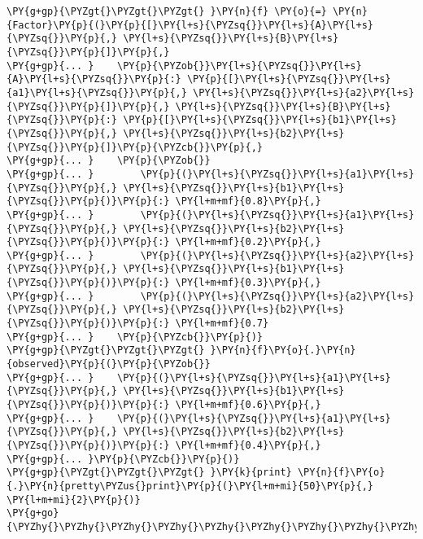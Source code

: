 \begin{fulllineitems}
\begin{fulllineitems}
\begin{Verbatim}[commandchars=\\\{\}]
\PY{g+gp}{\PYZgt{}\PYZgt{}\PYZgt{} }\PY{n}{f} \PY{o}{=} \PY{n}{Factor}\PY{p}{(}\PY{p}{[}\PY{l+s}{\PYZsq{}}\PY{l+s}{A}\PY{l+s}{\PYZsq{}}\PY{p}{,} \PY{l+s}{\PYZsq{}}\PY{l+s}{B}\PY{l+s}{\PYZsq{}}\PY{p}{]}\PY{p}{,}
\PY{g+gp}{... }    \PY{p}{\PYZob{}}\PY{l+s}{\PYZsq{}}\PY{l+s}{A}\PY{l+s}{\PYZsq{}}\PY{p}{:} \PY{p}{[}\PY{l+s}{\PYZsq{}}\PY{l+s}{a1}\PY{l+s}{\PYZsq{}}\PY{p}{,} \PY{l+s}{\PYZsq{}}\PY{l+s}{a2}\PY{l+s}{\PYZsq{}}\PY{p}{]}\PY{p}{,} \PY{l+s}{\PYZsq{}}\PY{l+s}{B}\PY{l+s}{\PYZsq{}}\PY{p}{:} \PY{p}{[}\PY{l+s}{\PYZsq{}}\PY{l+s}{b1}\PY{l+s}{\PYZsq{}}\PY{p}{,} \PY{l+s}{\PYZsq{}}\PY{l+s}{b2}\PY{l+s}{\PYZsq{}}\PY{p}{]}\PY{p}{\PYZcb{}}\PY{p}{,}
\PY{g+gp}{... }    \PY{p}{\PYZob{}}
\PY{g+gp}{... }        \PY{p}{(}\PY{l+s}{\PYZsq{}}\PY{l+s}{a1}\PY{l+s}{\PYZsq{}}\PY{p}{,} \PY{l+s}{\PYZsq{}}\PY{l+s}{b1}\PY{l+s}{\PYZsq{}}\PY{p}{)}\PY{p}{:} \PY{l+m+mf}{0.8}\PY{p}{,}
\PY{g+gp}{... }        \PY{p}{(}\PY{l+s}{\PYZsq{}}\PY{l+s}{a1}\PY{l+s}{\PYZsq{}}\PY{p}{,} \PY{l+s}{\PYZsq{}}\PY{l+s}{b2}\PY{l+s}{\PYZsq{}}\PY{p}{)}\PY{p}{:} \PY{l+m+mf}{0.2}\PY{p}{,}
\PY{g+gp}{... }        \PY{p}{(}\PY{l+s}{\PYZsq{}}\PY{l+s}{a2}\PY{l+s}{\PYZsq{}}\PY{p}{,} \PY{l+s}{\PYZsq{}}\PY{l+s}{b1}\PY{l+s}{\PYZsq{}}\PY{p}{)}\PY{p}{:} \PY{l+m+mf}{0.3}\PY{p}{,}
\PY{g+gp}{... }        \PY{p}{(}\PY{l+s}{\PYZsq{}}\PY{l+s}{a2}\PY{l+s}{\PYZsq{}}\PY{p}{,} \PY{l+s}{\PYZsq{}}\PY{l+s}{b2}\PY{l+s}{\PYZsq{}}\PY{p}{)}\PY{p}{:} \PY{l+m+mf}{0.7}
\PY{g+gp}{... }    \PY{p}{\PYZcb{}}\PY{p}{)}
\PY{g+gp}{\PYZgt{}\PYZgt{}\PYZgt{} }\PY{n}{f}\PY{o}{.}\PY{n}{observed}\PY{p}{(}\PY{p}{\PYZob{}}
\PY{g+gp}{... }    \PY{p}{(}\PY{l+s}{\PYZsq{}}\PY{l+s}{a1}\PY{l+s}{\PYZsq{}}\PY{p}{,} \PY{l+s}{\PYZsq{}}\PY{l+s}{b1}\PY{l+s}{\PYZsq{}}\PY{p}{)}\PY{p}{:} \PY{l+m+mf}{0.6}\PY{p}{,}
\PY{g+gp}{... }    \PY{p}{(}\PY{l+s}{\PYZsq{}}\PY{l+s}{a1}\PY{l+s}{\PYZsq{}}\PY{p}{,} \PY{l+s}{\PYZsq{}}\PY{l+s}{b2}\PY{l+s}{\PYZsq{}}\PY{p}{)}\PY{p}{:} \PY{l+m+mf}{0.4}\PY{p}{,}
\PY{g+gp}{... }\PY{p}{\PYZcb{}}\PY{p}{)}
\PY{g+gp}{\PYZgt{}\PYZgt{}\PYZgt{} }\PY{k}{print} \PY{n}{f}\PY{o}{.}\PY{n}{pretty\PYZus{}print}\PY{p}{(}\PY{l+m+mi}{50}\PY{p}{,} \PY{l+m+mi}{2}\PY{p}{)}
\PY{g+go}{\PYZhy{}\PYZhy{}\PYZhy{}\PYZhy{}\PYZhy{}\PYZhy{}\PYZhy{}\PYZhy{}\PYZhy{}\PYZhy{}\PYZhy{}\PYZhy{}\PYZhy{}\PYZhy{}\PYZhy{}\PYZhy{}\PYZhy{}\PYZhy{}\PYZhy{}\PYZhy{}\PYZhy{}\PYZhy{}\PYZhy{}\PYZhy{}\PYZhy{}\PYZhy{}\PYZhy{}\PYZhy{}\PYZhy{}\PYZhy{}\PYZhy{}\PYZhy{}\PYZhy{}\PYZhy{}\PYZhy{}\PYZhy{}\PYZhy{}\PYZhy{}\PYZhy{}\PYZhy{}\PYZhy{}\PYZhy{}\PYZhy{}\PYZhy{}\PYZhy{}\PYZhy{}\PYZhy{}\PYZhy{}\PYZhy{}\PYZhy{}}

\end{Verbatim}
\end{fulllineitems}
\end{fulllineitems}
